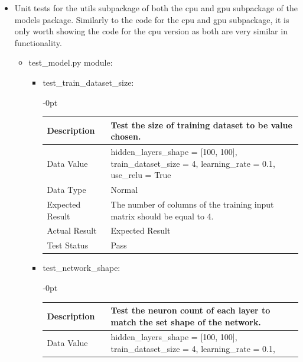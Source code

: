\documentclass[./project-report/src/latex/project-report.tex]{subfiles}
\begin{document}
\begin{itemize}
    \label{sec:models-utils-unit-tests}
    \item Unit tests for the utils subpackage of both the cpu and gpu subpackage of the models package. Similarly to the code for the cpu and gpu subpackage, it is 
          only worth showing the code for the cpu version as both are very similar in functionality.
        \begin{itemize}
            \item test\_model.py module:
				\begin{itemize}
					\item test\_train\_dataset\_size: \newline
					\begin{adjustwidth}{-\leftmargin}{0pt}
					\begin{tabular}{|p{0.25\linewidth}|p{0.75\linewidth}|}
						\hline
						Description & Test the size of training dataset to be value chosen. \\
						\hline	
						Data Value & hidden\_layers\_shape = [100, 100], \newline
								train\_dataset\_size = 4, \newline
								learning\_rate = 0.1, \newline
								use\_relu = True \\
						\hline
						Data Type & Normal \\
						\hline
						Expected Result & The number of columns of the training input matrix should be equal to 4. \\
						\hline
						Actual Result & Expected Result \\
						\hline
						Test Status & Pass \\
						\hline
					\end{tabular}
					\end{adjustwidth}
					\item test\_network\_shape: \newline
					\begin{adjustwidth}{-\leftmargin}{0pt}
					\begin{tabular}{|p{0.25\linewidth}|p{0.75\linewidth}|}
						\hline
						Description & Test the neuron count of each layer to match the set shape of the network. \\
						\hline
						Data Value & hidden\_layers\_shape = [100, 100], \newline
                         	train\_dataset\_size = 4, \newline
                         	learning\_rate = 0.1, \newline

\end{tabular}
\end{adjustwidth}
\end{itemize}
\end{itemize}
\end{itemize}
\end{document}
